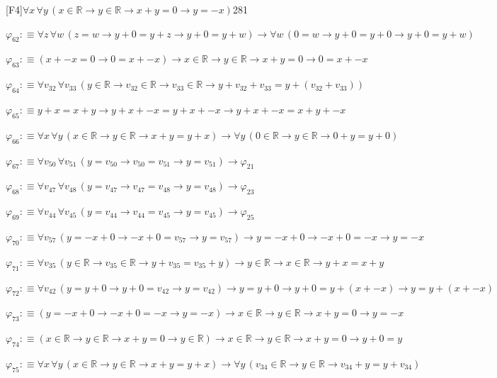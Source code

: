 \begin{fullproof}{[F4]}{$\forall x\,\forall y\,(x \in \mathbb{R} \to y \in \mathbb{R} \to x + y = 0 \to y = -x)$}{281}
\begin{abbrevlist}
\item $\varphi_{62} :\equiv \forall z\,\forall w\,(z = w \to y + 0 = y + z \to y + 0 = y + w) \to \forall w\,(0 = w \to y + 0 = y + 0 \to y + 0 = y + w)$
\item $\varphi_{63} :\equiv (x + -x = 0 \to 0 = x + -x) \to x \in \mathbb{R} \to y \in \mathbb{R} \to x + y = 0 \to 0 = x + -x$
\item $\varphi_{64} :\equiv \forall v_{32}\,\forall v_{33}\,(y \in \mathbb{R} \to v_{32} \in \mathbb{R} \to v_{33} \in \mathbb{R} \to y + v_{32} + v_{33} = y + (v_{32} + v_{33}))$
\item $\varphi_{65} :\equiv y + x = x + y \to y + x + -x = y + x + -x \to y + x + -x = x + y + -x$
\item $\varphi_{66} :\equiv \forall x\,\forall y\,(x \in \mathbb{R} \to y \in \mathbb{R} \to x + y = y + x) \to \forall y\,(0 \in \mathbb{R} \to y \in \mathbb{R} \to 0 + y = y + 0)$
\item $\varphi_{67} :\equiv \forall v_{50}\,\forall v_{51}\,(y = v_{50} \to v_{50} = v_{51} \to y = v_{51}) \to \varphi_{21}$
\item $\varphi_{68} :\equiv \forall v_{47}\,\forall v_{48}\,(y = v_{47} \to v_{47} = v_{48} \to y = v_{48}) \to \varphi_{23}$
\item $\varphi_{69} :\equiv \forall v_{44}\,\forall v_{45}\,(y = v_{44} \to v_{44} = v_{45} \to y = v_{45}) \to \varphi_{25}$
\item $\varphi_{70} :\equiv \forall v_{57}\,(y = -x + 0 \to -x + 0 = v_{57} \to y = v_{57}) \to y = -x + 0 \to -x + 0 = -x \to y = -x$
\item $\varphi_{71} :\equiv \forall v_{35}\,(y \in \mathbb{R} \to v_{35} \in \mathbb{R} \to y + v_{35} = v_{35} + y) \to y \in \mathbb{R} \to x \in \mathbb{R} \to y + x = x + y$
\item $\varphi_{72} :\equiv \forall v_{42}\,(y = y + 0 \to y + 0 = v_{42} \to y = v_{42}) \to y = y + 0 \to y + 0 = y + (x + -x) \to y = y + (x + -x)$
\item $\varphi_{73} :\equiv (y = -x + 0 \to -x + 0 = -x \to y = -x) \to x \in \mathbb{R} \to y \in \mathbb{R} \to x + y = 0 \to y = -x$
\item $\varphi_{74} :\equiv (x \in \mathbb{R} \to y \in \mathbb{R} \to x + y = 0 \to y \in \mathbb{R}) \to x \in \mathbb{R} \to y \in \mathbb{R} \to x + y = 0 \to y + 0 = y$
\item $\varphi_{75} :\equiv \forall x\,\forall y\,(x \in \mathbb{R} \to y \in \mathbb{R} \to x + y = y + x) \to \forall y\,(v_{34} \in \mathbb{R} \to y \in \mathbb{R} \to v_{34} + y = y + v_{34})$

\end{abbrevlist}
\end{fullproof}
